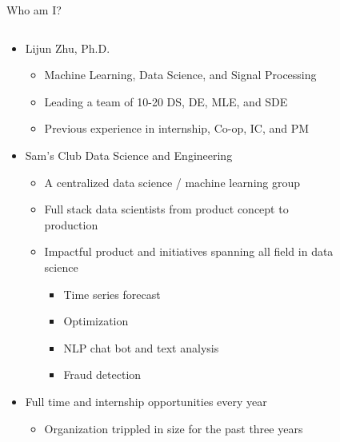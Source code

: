 \documentclass[aspectratio=169,xcolor=x11names,table]{beamer}
\begin{document}
\begin{frame}{Who am I?}
	\begin{columns}
		\begin{column}{0.8\linewidth}
		\begin{itemize}
			\item Lijun Zhu, Ph.D.
				\begin{itemize}
					\item Machine Learning, Data Science, and Signal Processing
					\item Leading a team of 10-20 DS, DE, MLE, and SDE
					\item Previous experience in internship, Co-op, IC, and PM
				\end{itemize}
			\item Sam's Club Data Science and Engineering
				\begin{itemize}
					\item A centralized data science / machine learning group
					\item Full stack data scientists from product concept to production
					\item Impactful product and initiatives spanning all field in data science
						\begin{itemize}
							\item Time series forecast
							\item Optimization
							\item NLP chat bot and text analysis
							\item Fraud detection
						\end{itemize}
				\end{itemize}
			\item Full time and internship opportunities every year
				\begin{itemize}
					\item Organization trippled in size for the past three years
				\end{itemize}
		\end{itemize}
		\end{column}
		\hfill
		\begin{column}{0.2\linewidth}
			\begin{figure}
				\centering

\end{figure}
\end{column}
\end{columns}
\end{frame}
\end{document}
